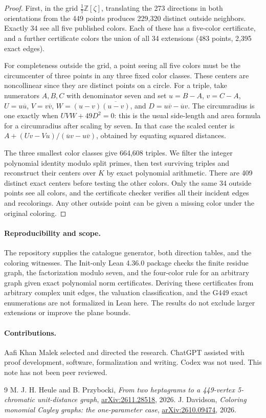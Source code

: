 \documentclass[11pt,letterpaper]{article}
\newcommand{\Z}{\mathbb Z}
\begin{document}
\begin{proof}
First, in the grid $\tfrac17\Z[\zeta]$, translating the
273 directions in both orientations from the 449 points
produces 229,320 distinct outside neighbors. Exactly 34 see
all five published colors. Each of these has a five-color
certificate, and a further certificate colors the union of
all 34 extensions (483 points, 2,395 exact edges).

For completeness outside the grid, a point seeing all five
colors must be the circumcenter of three points in any three
fixed color classes. These centers are noncollinear since
they are distinct points on a circle. For a triple, take
numerators $A,B,C$ with denominator seven and set
$u=B-A$, $v=C-A$, $U=u\overline u$, $V=v\overline v$,
$W=(u-v)\overline{(u-v)}$, and
$D=u\overline v-\overline u v$. The circumradius is one
exactly when $UVW+49D^2=0$: this is the usual side-length
and area formula for a circumradius after scaling by seven.
In that case the scaled center is
$A+(Uv-Vu)/(\overline u v-u\overline v)$, obtained by
equating squared distances.

The three smallest color classes give 664,608 triples.
We filter the integer polynomial identity modulo split
primes, then test surviving triples and reconstruct their
centers over $K$ by exact polynomial arithmetic. There are
409 distinct exact centers before testing the other colors.
Only the same 34 outside points see all colors, and the
certificate checker verifies all their incident edges and
recolorings. Any other outside point can be given a missing
color under the original coloring.
\end{proof}

\paragraph{Reproducibility and scope.}
The repository supplies the catalogue generator, both direction
tables, and the coloring witnesses. The Init-only Lean 4.36.0
package checks the finite residue graph, the factorization
modulo seven, and the four-color rule for an arbitrary graph
given exact polynomial norm certificates. Deriving these
certificates from arbitrary complex unit edges, the valuation
classification, and the G449 exact enumerations are not formalized in
Lean here. The results do not exclude larger extensions or improve
the plane bounds.

\paragraph{Contributions.}
Aafi Khan Malek selected and directed the research. ChatGPT assisted
with proof development, software, formalization and writing. Codex
was not used. This note has not been peer reviewed.

\begin{thebibliography}{9}
 M. J. H. Heule and B. Przybocki,
\emph{From two heptagrams to a 449-vertex 5-chromatic unit-distance graph},
\href{https://arxiv.org/abs/2611.28518}{arXiv:2611.28518}, 2026.
 J. Davidson,
\emph{Coloring monomial Cayley graphs: the one-parameter case},
\href{https://arxiv.org/abs/2610.09474}{arXiv:2610.09474}, 2026.
\end{thebibliography}
\end{document}
